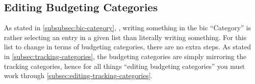 \subsection{Editing Budgeting Categories}
\label{subsec:editing-categories-for-budgeting}

As stated in \autoref{subsubsec:bic-category}, , writing something in the \ac{bic} ``Category'' is rather selecting an entry in a given list than literally writing something.
For this list to change in terms of budgeting categories, there are no extra steps.
As stated in \autoref{subsec:tracking-categories}, the budgeting categories are simply mirroring the tracking categories, hence for all things ``editing budgeting categories'' you must work through \autoref{subsec:editing-tracking-categories}.